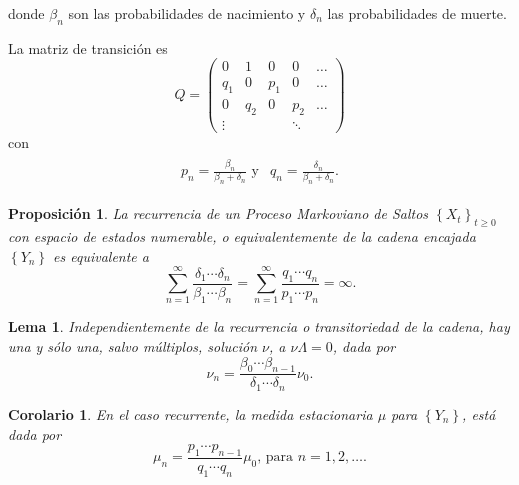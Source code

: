 \documentclass{article}
\newtheorem{Prop}{Proposición}[section]
\newtheorem{Cor}{Corolario}[section]
\newtheorem{Lema}{Lema}[section]
\numberwithin{equation}{section}
\begin{document}
donde $\beta_{n}$ son las probabilidades de nacimiento y $\delta_{n}$ las probabilidades de muerte.

La matriz de transici\'on es
\begin{equation}
Q=\left(\begin{array}{ccccc}
0& 1 & 0 & 0 & \ldots\\
q_{1}&0 & p_{1}&0&\ldots\\
0&q_{2}&0& p_{2}&\ldots\\
\vdots & & & \ddots &
\end{array}\right)
\end{equation}
con 
\begin{eqnarray}
\begin{array}{ll}
p_{n}=\frac{\beta_{n}}{\beta_{n}+\delta_{n}}\textrm{  y}& q_{n}=\frac{\delta_{n}}{\beta_{n}+\delta_{n}}.
\end{array}
\end{eqnarray}

\begin{Prop}\label{Prop.2.1}
La recurrencia de un Proceso Markoviano de Saltos $\left\{X_{t}\right\}_{t\geq0}$ con espacio de estados numerable, o equivalentemente de la cadena encajada $\left\{Y_{n}\right\}$ es equivalente a
\begin{equation}\label{Eq.2.1}
\sum_{n=1}^{\infty}\frac{\delta_{1}\cdots\delta_{n}}{\beta_{1}\cdots\beta_{n}}=\sum_{n=1}^{\infty}\frac{q_{1}\cdots q_{n}}{p_{1}\cdots p_{n}}=\infty.
\end{equation}
\end{Prop}

\begin{Lema}\label{Lema.2.2}
Independientemente de la recurrencia o transitoriedad de la cadena, hay una y s\'olo una, salvo m\'ultiplos, soluci\'on $\nu$, a $\nu\Lambda=0$, dada por
\begin{equation}\label{Eq.2.2}
\nu_{n}=\frac{\beta_{0}\cdots\beta_{n-1}}{\delta_{1}\cdots\delta_{n}}\nu_{0}.
\end{equation}
\end{Lema}

\begin{Cor}\label{Corolario2.3}
En el caso recurrente, la medida estacionaria $\mu$ para $\left\{Y_{n}\right\}$, est\'a dada por
\begin{equation}\label{Eq.2.3}
\mu_{n}=\frac{p_{1}\cdots p_{n-1}}{q_{1}\cdots q_{n}}\mu_{0}\textrm{, para }n=1,2,\ldots.
\end{equation}
\end{Cor}
\end{document}
